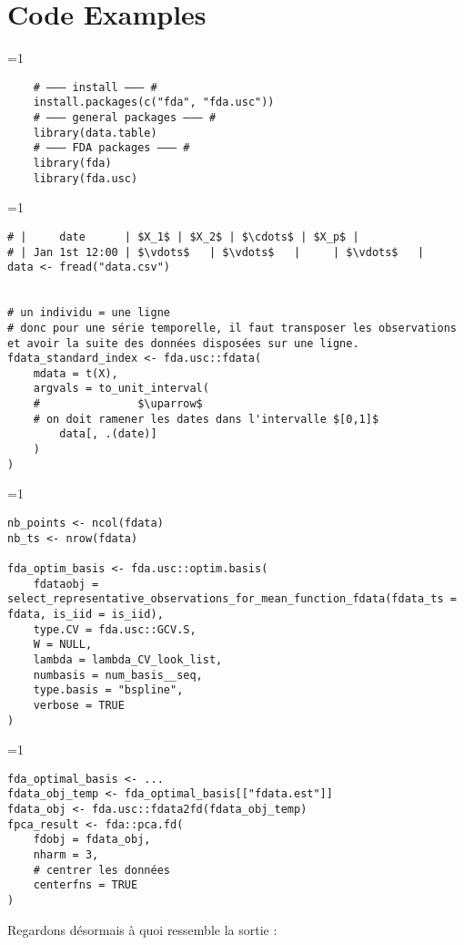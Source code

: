 \chapter{Code Examples}

\ifnum\value{code}=1
	\begin{verbatim}
    # ——— install ——— #
    install.packages(c("fda", "fda.usc"))
    # ——— general packages ——— #
    library(data.table)
    # ——— FDA packages ——— #
    library(fda)
    library(fda.usc)
\end{verbatim}
\fi

\ifnum\value{code}=1
	\begin{verbatim} 
# |     date      | $X_1$ | $X_2$ | $\cdots$ | $X_p$ |
# | Jan 1st 12:00 | $\vdots$   | $\vdots$   |     | $\vdots$   |
data <- fread("data.csv")


# un individu = une ligne
# donc pour une série temporelle, il faut transposer les observations et avoir la suite des données disposées sur une ligne.
fdata_standard_index <- fda.usc::fdata(
    mdata = t(X),
    argvals = to_unit_interval(
    #               $\uparrow$
    # on doit ramener les dates dans l'intervalle $[0,1]$
        data[, .(date)]
    )
)
\end{verbatim}
\fi

\ifnum\value{code}=1
	\begin{verbatim}
nb_points <- ncol(fdata)
nb_ts <- nrow(fdata)
 
fda_optim_basis <- fda.usc::optim.basis(
    fdataobj = select_representative_observations_for_mean_function_fdata(fdata_ts = fdata, is_iid = is_iid),
    type.CV = fda.usc::GCV.S,
    W = NULL,
    lambda = lambda_CV_look_list,
    numbasis = num_basis__seq,
    type.basis = "bspline",
    verbose = TRUE
)
\end{verbatim}
\fi

\ifnum\value{code}=1
	\begin{verbatim}
fda_optimal_basis <- ...
fdata_obj_temp <- fda_optimal_basis[["fdata.est"]]
fdata_obj <- fda.usc::fdata2fd(fdata_obj_temp)
fpca_result <- fda::pca.fd(
    fdobj = fdata_obj,
    nharm = 3,
    # centrer les données
    centerfns = TRUE
)
\end{verbatim}
\fi

Regardons désormais à quoi ressemble la sortie :

